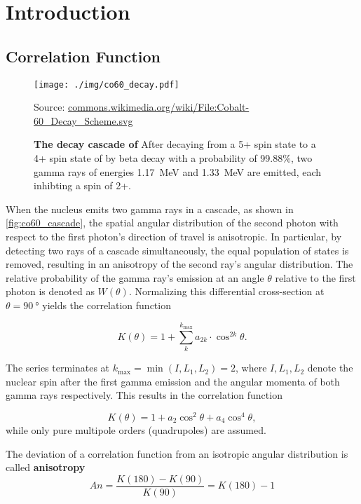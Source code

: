 \chapter{Introduction}

\section{Correlation Function}
\begin{figure}[tbp]
	\centering
	\texttt{[image: ./img/co60\_decay.pdf]}
	\caption*{Source: \url{commons.wikimedia.org/wiki/File:Cobalt-60_Decay_Scheme.svg}}
	\caption[The decay cascade of ]{\textbf{The decay cascade of } After decaying from a 5+ spin state to a 4+ spin state of  by beta decay with a probability of \num{99.88}\%, two gamma rays of energies \SI{1.17}{\MeV} and \SI{1.33}{\MeV} are emitted, each inhibting a spin of 2+.}
	\label{fig:co60_cascade}
\end{figure}
When the nucleus emits two gamma rays in a cascade, as shown in \autoref{fig:co60_cascade}, the spatial angular distribution of the second photon with respect to the first photon's direction of travel is anisotropic.
In particular, by detecting two rays of a cascade simultaneously, the equal population of states is removed, resulting in an anisotropy of the second ray's angular distribution.
The relative probability of the gamma ray's emission at an angle $\theta$ relative to the first photon is denoted as $W(\theta)$.
Normalizing this differential cross-section at $\theta=\SI{90}{\degree}$ yields the correlation function

\begin{equation*}
	K(\theta) = 1 + \sum_{k}^{k_\text{max}}a_{2k}\cdot\cos^{2k}{\theta}.
\end{equation*}

The series terminates at $k_\text{max}=\min(I, L_1, L_2)=2$, where $I, L_1, L_2$ denote the nuclear spin after the first gamma emission and the angular momenta of both gamma rays respectively.
This results in the correlation function

\begin{equation}\label{eq:corr_func}
	K(\theta) = 1 + a_2\cos^{2}{\theta} + a_4\cos^{4}{\theta},
\end{equation}
while only pure multipole orders (quadrupoles) are assumed.

The deviation of a correlation function from an isotropic angular distribution is called \textbf{anisotropy}
\begin{equation}\label{eq:aniso}
	An=\frac{K(180)-K(90)}{K(90)}=K(180)-1
\end{equation}

